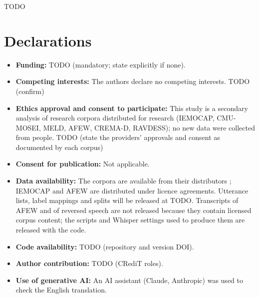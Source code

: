 \documentclass[sn-nature,pdflatex]{sn-jnl}
\begin{document}










\backmatter

TODO

\section*{Declarations}

\begin{itemize}
\item \textbf{Funding:} TODO (mandatory; state explicitly if none).
\item \textbf{Competing interests:} The authors declare no competing interests. TODO (confirm)
\item \textbf{Ethics approval and consent to participate:} This study is a secondary analysis of research corpora distributed for research (IEMOCAP, CMU-MOSEI, MELD, AFEW, CREMA-D, RAVDESS); no new data were collected from people. TODO (state the providers' approvals and consent as documented by each corpus)
\item \textbf{Consent for publication:} Not applicable.
\item \textbf{Data availability:} The corpora are available from their distributors \cite{busso2008iemocap,zadeh2018mosei,poria2019meld,dhall2012afew,cao2014cremad,livingstone2018ravdess}; IEMOCAP and AFEW are distributed under licence agreements. Utterance lists, label mappings and splits will be released at TODO. Transcripts of AFEW and of reversed speech are not released because they contain licensed corpus content; the scripts and Whisper settings used to produce them are released with the code.
\item \textbf{Code availability:} TODO (repository and version DOI).
\item \textbf{Author contribution:} TODO (CRediT roles).
\item \textbf{Use of generative AI:} An AI assistant (Claude, Anthropic) was used to check the English translation.
\end{itemize}
\end{document}
